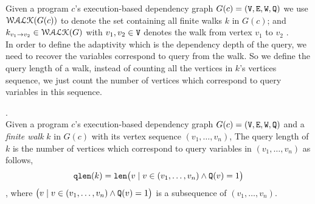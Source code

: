 %
Given 
a program $c$'s execution-based dependency graph $G(c) = (\mathtt{V}, \mathtt{E}, \mathtt{W}, \mathtt{Q})$
we use $\mathcal{WALK}(G(c))$ to denote 
the set containing all finite walks $k$ in $G(c)$;
and $k_{v_1 \to v_2} \in \mathcal{WALK}(G)$ with $v_1, v_2 \in \mathtt{V}$ denotes the walk from vertex $v_1$ to $v_2$ .
%
\\
In order to define the adaptivity which is the dependency depth of the query, we need to recover the 
variables correspond to query from the walk. So we define the query length of a walk, 
instead of counting all 
the vertices in $k$'s vertices sequence, we just count the number of vertices which correspond to query variables in this sequence.
%
\begin{defn}.
\label{def:qlen}
\\
Given 
a program $c$'s execution-based dependency graph $G(c) = (\mathtt{V}, \mathtt{E}, \mathtt{W}, \mathtt{Q})$
 and a \emph{finite walk} $k$ in $G(c)$ with its vertex sequence $(v_1, \ldots, v_{n})$, 
The query length of $k$ is the number of vertices which correspond to query variables in $(v_1, \ldots, v_{n})$ as follows, 
\[
  \mathtt{qlen}(k) = \mathtt{len}\big( v \mid v \in (v_1, \ldots, v_{n}) \land \mathtt{Q}(v) = 1 \big)
\]
, where $\big(v \mid v \in (v_1, \ldots, v_{n}) \land \mathtt{Q}(v) = 1 \big)$ is a subsequence of $(v_1, \ldots, v_{n})$.
\end{defn}
